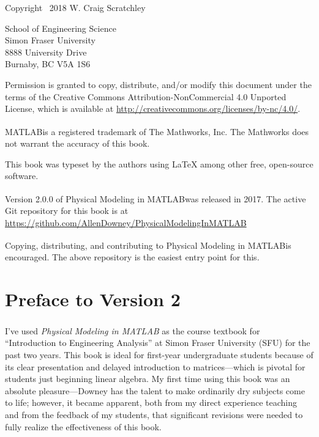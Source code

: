 \documentclass[
]{book}
\numberwithin{Answer}{chapter}
\numberwithin{Exercise}{chapter}
\newcommand{\myreg}{\textsuperscript{{\tiny \textregistered}}}
\newcommand{\thetitle}{Physical Modeling in MATLAB\myreg}
\begin{document}
\vspace{0.5em}

Copyright \textcopyright \, 2018 W. Craig Scratchley

\vspace{0.5em}

\begin{flushleft}
School of Engineering Science\\
Simon Fraser University\\
8888 University Drive\\
Burnaby, BC V5A 1S6
\end{flushleft}

\vspace{2em}

Permission is granted to copy, distribute, and/or modify this document
under the terms of the Creative Commons Attribution-NonCommercial 4.0 Unported License, which is available at \url{http://creativecommons.org/licenses/by-nc/4.0/}.

MATLAB\myreg is a registered trademark of The
Mathworks, Inc.  The Mathworks does not warrant the accuracy
of this book.

\vspace{2em}

This book was typeset by the authors using \LaTeX
among other free, open-source software.

Version 2.0.0 of \thetitle was released in 2017. The active Git
    repository for this book is at
    \url{https://github.com/AllenDowney/PhysicalModelingInMATLAB}

Copying, distributing, and contributing to \thetitle is encouraged.
The above repository is the easiest entry point for this.

\chapter{Preface to Version 2}

I've used \textit{\thetitle} as the course
textbook for ``Introduction to Engineering Analysis'' at Simon Fraser
University (SFU) for the past two years. This book is ideal for
first-year undergraduate students because of its clear presentation and
delayed introduction to matrices---which is pivotal for students
just beginning linear algebra.  My first time using this book was an
absolute pleasure---Downey has the talent to make ordinarily dry
subjects come to life; however, it became apparent, both from my direct
experience teaching and from the feedback of my students, that
significant revisions were needed to fully realize the effectiveness
of this book.
\end{document}
